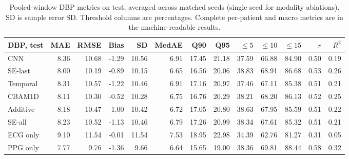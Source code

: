 \documentclass[11pt]{article}
\begin{document}
\begin{table}[t]\centering\scriptsize\setlength{\tabcolsep}{3pt}
\begin{tabular}{lrrrrrrrrrrrr}\toprule
DBP, test & MAE & RMSE & Bias & SD & MedAE & Q90 & Q95 & $\leq5$ & $\leq10$ & $\leq15$ & $r$ & $R^2$\\\midrule
CNN & 8.36 & 10.68 & -1.29 & 10.56 & 6.91 & 17.45 & 21.18 & 37.59 & 66.88 & 84.90 & 0.50 & 0.19\\
SE-last & 8.00 & 10.19 & -0.89 & 10.15 & 6.65 & 16.56 & 20.06 & 38.83 & 68.91 & 86.68 & 0.53 & 0.26\\
Temporal & 8.31 & 10.57 & -1.22 & 10.46 & 6.91 & 17.16 & 20.97 & 37.46 & 67.11 & 85.38 & 0.51 & 0.21\\
CBAM1D & 8.11 & 10.30 & -0.52 & 10.28 & 6.75 & 16.76 & 20.29 & 38.21 & 68.20 & 86.13 & 0.52 & 0.25\\
Additive & 8.18 & 10.47 & -1.00 & 10.42 & 6.72 & 17.05 & 20.80 & 38.63 & 67.95 & 85.59 & 0.51 & 0.22\\
SE-all & 8.23 & 10.52 & -1.13 & 10.46 & 6.79 & 17.26 & 20.99 & 38.34 & 67.61 & 85.32 & 0.51 & 0.21\\
ECG only & 9.10 & 11.54 & -0.01 & 11.54 & 7.53 & 18.95 & 22.98 & 34.39 & 62.76 & 81.27 & 0.31 & 0.05\\
PPG only & 7.77 & 9.76 & -1.36 & 9.66 & 6.64 & 15.65 & 19.00 & 38.36 & 69.81 & 88.44 & 0.58 & 0.32\\
\bottomrule\end{tabular}
\caption{Pooled-window DBP metrics on test, averaged across matched seeds (single seed for modality ablations). SD is sample error SD. Threshold columns are percentages. Complete per-patient and macro metrics are in the machine-readable results.}\end{table}
\end{document}
